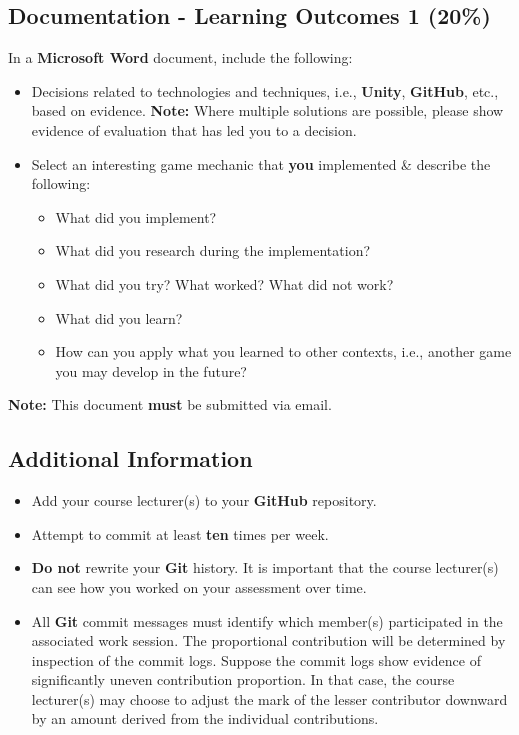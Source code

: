 \documentclass{article}
\begin{document}
\subsection*{Documentation - Learning Outcomes 1 (20\%)}
In a \textbf{Microsoft Word} document, include the following:
\begin{itemize}
	\item Decisions related to technologies and techniques, i.e., \textbf{Unity}, \textbf{GitHub}, etc., based on evidence. \textbf{Note:} Where multiple solutions are possible, please show evidence of evaluation that has led you to a decision.
	\item Select an interesting game mechanic that \textbf{you} implemented \& describe the following:
	\begin{itemize}
		\item What did you implement?
		\item What did you research during the implementation?
		\item What did you try? What worked? What did not work?
		\item What did you learn?
		\item How can you apply what you learned to other contexts, i.e., another game you may develop in the future?
	\end{itemize}
\end{itemize}
\textbf{Note:} This document \textbf{must} be submitted via email. 

\subsection*{Additional Information}
\begin{itemize}
	\item Add your course lecturer(s) to your \textbf{GitHub} repository.
	\item Attempt to commit at least \textbf{ten} times per week.
	\item \textbf{Do not} rewrite your \textbf{Git} history. It is important that the course lecturer(s) can see how you worked on your assessment over time.
	\item All \textbf{Git} commit messages must identify which member(s) participated in the associated work session. The proportional contribution will be determined by inspection of the commit logs. Suppose the commit logs show evidence of significantly uneven contribution proportion. In that case, the course lecturer(s) may choose to adjust the mark of the lesser contributor downward by an amount derived from the individual contributions. 
\end{itemize}
\end{document}
